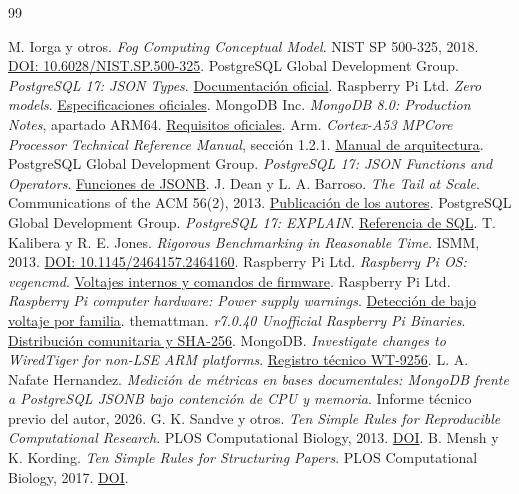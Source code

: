 \documentclass[10pt,a4paper]{article}
\begin{document}
\clearpage
{}
{}
\begin{thebibliography}{99}
\small\raggedright
{} M. Iorga y otros. \textit{Fog Computing Conceptual Model}. NIST SP 500-325, 2018. \href{https://doi.org/10.6028/NIST.SP.500-325}{DOI: 10.6028/NIST.SP.500-325}.
 PostgreSQL Global Development Group. \textit{PostgreSQL 17: JSON Types}. \href{https://www.postgresql.org/docs/17/datatype-json.html}{Documentación oficial}.
 Raspberry Pi Ltd. \textit{Zero models}. \href{https://www.raspberrypi.com/documentation/computers/zero.html}{Especificaciones oficiales}.
 MongoDB Inc. \textit{MongoDB 8.0: Production Notes}, apartado ARM64. \href{https://www.mongodb.com/docs/v8.0/administration/production-notes/#arm64}{Requisitos oficiales}.
 Arm. \textit{Cortex-A53 MPCore Processor Technical Reference Manual}, sección 1.2.1. \href{https://documentation-service.arm.com/static/6040c321ee937942ba301626}{Manual de arquitectura}.
 PostgreSQL Global Development Group. \textit{PostgreSQL 17: JSON Functions and Operators}. \href{https://www.postgresql.org/docs/17/functions-json.html}{Funciones de JSONB}.
 J. Dean y L. A. Barroso. \textit{The Tail at Scale}. Communications of the ACM 56(2), 2013. \href{https://research.google/pubs/the-tail-at-scale/}{Publicación de los autores}.
 PostgreSQL Global Development Group. \textit{PostgreSQL 17: EXPLAIN}. \href{https://www.postgresql.org/docs/17/sql-explain.html}{Referencia de SQL}.
 T. Kalibera y R. E. Jones. \textit{Rigorous Benchmarking in Reasonable Time}. ISMM, 2013. \href{https://doi.org/10.1145/2464157.2464160}{DOI: 10.1145/2464157.2464160}.
 Raspberry Pi Ltd. \textit{Raspberry Pi OS: vcgencmd}. \href{https://www.raspberrypi.com/documentation/computers/os.html#measure_volts-block}{Voltajes internos y comandos de firmware}.
 Raspberry Pi Ltd. \textit{Raspberry Pi computer hardware: Power supply warnings}. \href{https://www.raspberrypi.com/documentation/computers/raspberry-pi.html#power-supply-warnings}{Detección de bajo voltaje por familia}.
 themattman. \textit{r7.0.40 Unofficial Raspberry Pi Binaries}. \href{https://github.com/themattman/mongodb-raspberrypi-binaries/releases/tag/r7.0.40-rpi-unofficial}{Distribución comunitaria y SHA-256}.
 MongoDB. \textit{Investigate changes to WiredTiger for non-LSE ARM platforms}. \href{https://jira.mongodb.org/browse/WT-9256}{Registro técnico WT-9256}.
 L. A. Nafate Hernandez. \textit{Medición de métricas en bases documentales: MongoDB frente a PostgreSQL JSONB bajo contención de CPU y memoria}. Informe técnico previo del autor, 2026.
 G. K. Sandve y otros. \textit{Ten Simple Rules for Reproducible Computational Research}. PLOS Computational Biology, 2013. \href{https://doi.org/10.1371/journal.pcbi.1003285}{DOI}.
 B. Mensh y K. Kording. \textit{Ten Simple Rules for Structuring Papers}. PLOS Computational Biology, 2017. \href{https://doi.org/10.1371/journal.pcbi.1005619}{DOI}.
\end{thebibliography}
\end{document}
